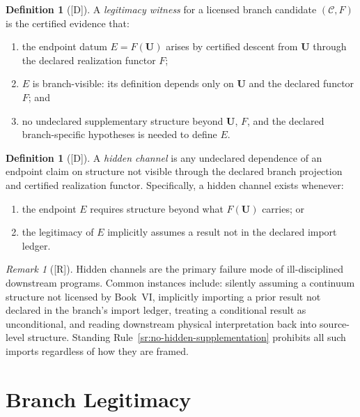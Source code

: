 \documentclass[12pt,oneside]{amsbook}
\theoremstyle{plain}
\theoremstyle{definition}
\newtheorem{definition}[theorem]{Definition}
\theoremstyle{remark}
\newtheorem{remark}[theorem]{Remark}
\newcommand{\status}[1]{\textup{[#1]}}
\begin{document}
\begin{definition}[\status{D}]\label{def:legitimacy-witness}
A \emph{legitimacy witness} for a licensed branch candidate
$(\mathcal{C}, F)$ is the certified evidence that:
\begin{enumerate}[label=\textup{(\arabic*)}]
  \item the endpoint datum $E = F(\mathbf{U})$ arises by certified
        descent from $\mathbf{U}$ through the declared realization
        functor $F$;
  \item $E$ is branch-visible: its definition depends only on
        $\mathbf{U}$ and the declared functor $F$; and
  \item no undeclared supplementary structure beyond $\mathbf{U}$, $F$,
        and the declared branch-specific hypotheses is needed to define
        $E$.
\end{enumerate}
\end{definition}

\begin{definition}[\status{D}]\label{def:hidden-channel}
A \emph{hidden channel} is any undeclared dependence of an endpoint
claim on structure not visible through the declared branch projection
and certified realization functor.  Specifically, a hidden channel
exists whenever:
\begin{enumerate}[label=\textup{(\arabic*)}]
  \item the endpoint $E$ requires structure beyond what $F(\mathbf{U})$
        carries; or
  \item the legitimacy of $E$ implicitly assumes a result not in the
        declared import ledger.
\end{enumerate}
\end{definition}

\begin{remark}[\status{R}]\label{rmk:hidden-channel-examples}
Hidden channels are the primary failure mode of ill-disciplined
downstream programs.  Common instances include: silently assuming a
continuum structure not licensed by Book~VI, implicitly importing a
prior result not declared in the branch's import ledger, treating a
conditional result as unconditional, and reading downstream physical
interpretation back into source-level structure.  Standing
Rule~\ref{sr:no-hidden-supplementation} prohibits all such imports
regardless of how they are framed.
\end{remark}

\section{Branch Legitimacy}
\end{document}
